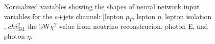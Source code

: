 \begin{figure}[h!]
\vspace{-4.5mm}
\hfil
{}
\caption{Normalized variables showing the shapes of neural network input variables for the $e$+jets channel: [lepton $p_T$, lepton $\eta$, lepton isolation , $chi^2_{\text{SM}}$ the bW$\chi^2$ value from neutrino reconstrucion, photon E, and photon $\eta$.  }
\label{fig:VarPlotsej5}
\end{figure}

